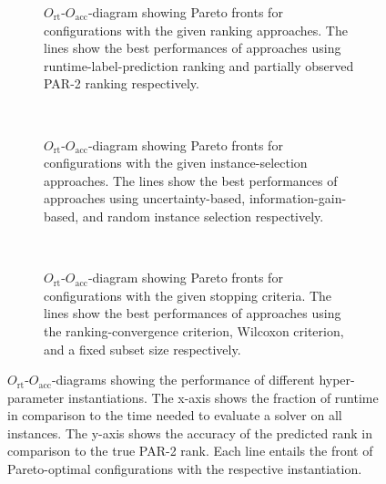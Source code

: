 \documentclass[runningheads]{llncs}
\begin{document}
\begin{figure}[tbp!]
  \centering
  \begin{subfigure}{1.0\textwidth}
    \caption{
    	$O_{\operatorname{rt}}$-$O_{\operatorname{acc}}$-diagram showing Pareto fronts for configurations with the given ranking approaches.
    	The lines show the best performances of approaches using runtime-label-prediction ranking and partially observed PAR-2 ranking respectively.
    }
    \label{fig:annitraincolorranking}
  \end{subfigure}
  \\
  \vspace{0.2cm}
  \begin{subfigure}{1.0\textwidth}
    \caption{
    	$O_{\operatorname{rt}}$-$O_{\operatorname{acc}}$-diagram showing Pareto fronts for configurations with the given instance-selection approaches.
    	The lines show the best performances of approaches using uncertainty-based, information-gain-based, and random instance selection respectively.
    }
    \label{fig:annitraincolorselection}
  \end{subfigure}
  \\
  \vspace{0.2cm}
  \begin{subfigure}{1.0\textwidth}
    \caption{
    	$O_{\operatorname{rt}}$-$O_{\operatorname{acc}}$-diagram showing Pareto fronts for configurations with the given stopping criteria.
    	The lines show the best performances of approaches using the ranking-convergence criterion, Wilcoxon criterion, and a fixed subset size respectively.
    }
    \label{fig:annitraincolorstopping}
  \end{subfigure}

  \caption{
  	$O_{\operatorname{rt}}$-$O_{\operatorname{acc}}$-diagrams showing the performance of different hyper-parameter instantiations.
  	The x-axis shows the fraction of runtime in comparison to the time needed to evaluate a solver on all instances.
  	The y-axis shows the accuracy of the predicted rank in comparison to the true PAR-2 rank.
  	Each line entails the front of Pareto-optimal configurations with the respective instantiation.
  }
  \label{fig:e2eallsolvers}
\end{figure}
\end{document}
